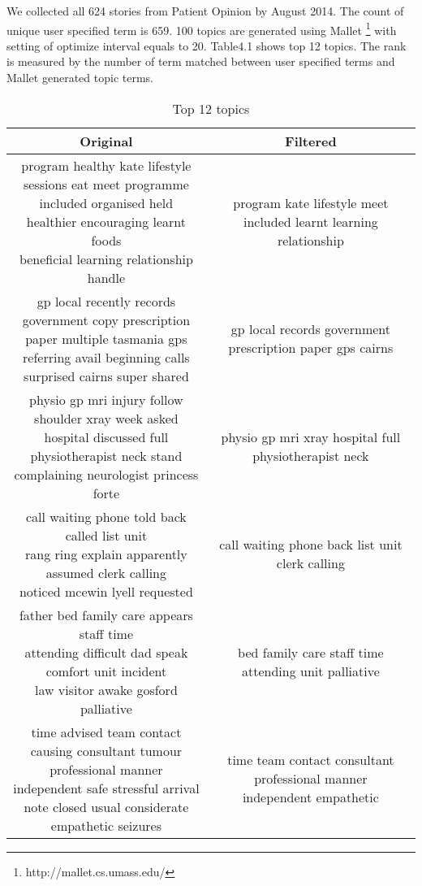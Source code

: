 \documentclass[11pt,twoside]{report}
\begin{document}
We collected all 624 stories from Patient Opinion by August 2014. The count of unique user specified term is 659. 100 topics are generated using Mallet \footnote{http://mallet.cs.umass.edu/} with setting of optimize interval equals to 20. Table4.1 shows top 12 topics. The rank is measured by the number of term matched between user specified terms and Mallet generated topic terms.
\begin{table}[ht]
\tiny
\caption{Top 12 topics}
\centering
\begin{tabular}{|c|c|}
\hline\hline
Original & Filtered\\
\hline
\makecell{program healthy kate lifestyle sessions eat meet programme\\
	 included organised held healthier encouraging learnt foods\\
	 beneficial learning relationship handle} & {program kate lifestyle meet included learnt learning relationship} \\
\hline

\makecell{gp local recently records government copy prescription\\
	 paper multiple tasmania gps referring avail beginning calls\\
	  surprised cairns super shared } & {gp local records government prescription paper gps cairns}\\
\hline

\makecell{physio gp mri injury follow shoulder xray week asked\\
	 hospital discussed full physiotherapist neck stand \\
	 complaining neurologist princess forte} & {physio gp mri xray hospital full physiotherapist neck}\\
\hline

\makecell{call waiting phone told back called list unit\\
	 rang ring explain apparently assumed clerk calling\\
	 noticed mcewin lyell requested} & {call waiting phone back list unit clerk calling}\\
\hline
  
\makecell{father bed family care appears staff time\\
	 attending difficult dad speak comfort unit incident\\
	 law visitor awake gosford palliative} & {bed family care staff time attending unit palliative}\\
\hline
	
\makecell{time advised team contact causing consultant tumour\\
	 professional manner independent safe stressful arrival\\
	 note closed usual considerate empathetic seizures} & \makecell{time team contact consultant professional manner\\ independent empathetic}\\
\hline


\end{tabular}
\end{table}
\end{document}
